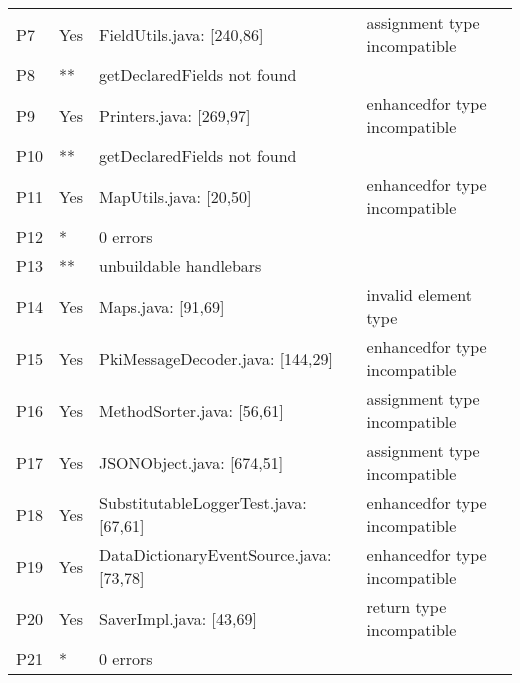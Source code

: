 \begin{table}[]
\begin{tabular}{|p{1.5cm}|p{1cm}|p{4cm}|p{5cm}|}
        P7 & Yes & FieldUtils.java: [240,86] & assignment type incompatible  \\
        P8 & ** & getDeclaredFields not found &   \\
        P9 & Yes & Printers.java: [269,97]  &  enhancedfor type incompatible \\
        P10 & ** & getDeclaredFields not found  &  \\
        P11 & Yes & MapUtils.java: [20,50]   & enhancedfor type incompatible  \\
        P12 & *  & 0 errors &  \\
        P13 & ** & unbuildable handlebars &  \\
        P14 & Yes  & Maps.java: [91,69] & invalid element type   \\
        P15 & Yes & PkiMessageDecoder.java: [144,29]  &  enhancedfor type incompatible  \\
        P16 & Yes & MethodSorter.java: [56,61]  & assignment type incompatible  \\
        P17 & Yes & JSONObject.java: [674,51]  & assignment type incompatible  \\
        P18 & Yes & SubstitutableLoggerTest.java: [67,61]   & enhancedfor type incompatible  \\
        P19 & Yes & DataDictionaryEventSource.java: [73,78]  &  enhancedfor type incompatible  \\
        P20 & Yes & SaverImpl.java: [43,69]  &  return type incompatible  \\
        P21 & * & 0 errors &   \\ \hline
    \end{tabular}
\end{table}
